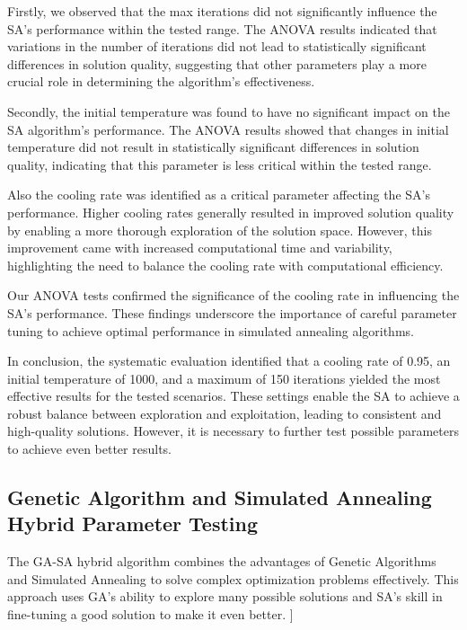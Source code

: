 \documentclass{article}
\begin{document}
    Firstly, we observed that the max iterations did not significantly influence the SA's performance within the tested range. The ANOVA results indicated that variations in the number of iterations did not lead to statistically significant differences in solution quality, suggesting that other parameters play a more crucial role in determining the algorithm's effectiveness.

    Secondly, the initial temperature was found to have no significant impact on the SA algorithm's performance. The ANOVA results showed that changes in initial temperature did not result in statistically significant differences in solution quality, indicating that this parameter is less critical within the tested range.

    Also the cooling rate was identified as a critical parameter affecting the SA’s performance. Higher cooling rates generally resulted in improved solution quality by enabling a more thorough exploration of the solution space. However, this improvement came with increased computational time and variability, highlighting the need to balance the cooling rate with computational efficiency.

    Our ANOVA tests confirmed the significance of the cooling rate in influencing the SA’s performance. These findings underscore the importance of careful parameter tuning to achieve optimal performance in simulated annealing algorithms.

    In conclusion, the systematic evaluation identified that a cooling rate of 0.95, an initial temperature of 1000, and a maximum of 150 iterations yielded the most effective results for the tested scenarios. These settings enable the SA to achieve a robust balance between exploration and exploitation, leading to consistent and high-quality solutions. However, it is necessary to further test possible parameters to achieve even better results.

    \newpage

    \subsection{Genetic Algorithm and Simulated Annealing Hybrid Parameter Testing}\label{subsec:genetic-algorithm-and-simulated-annealing-hybrid-parameter-testing}

    The GA-SA hybrid algorithm combines the advantages of Genetic Algorithms and Simulated Annealing to solve complex optimization problems effectively. This approach uses GA's ability to explore many possible solutions and SA's skill in fine-tuning a good solution to make it even better. \cite[p. 94--96]{toth2014vehicle}]
\end{document}
